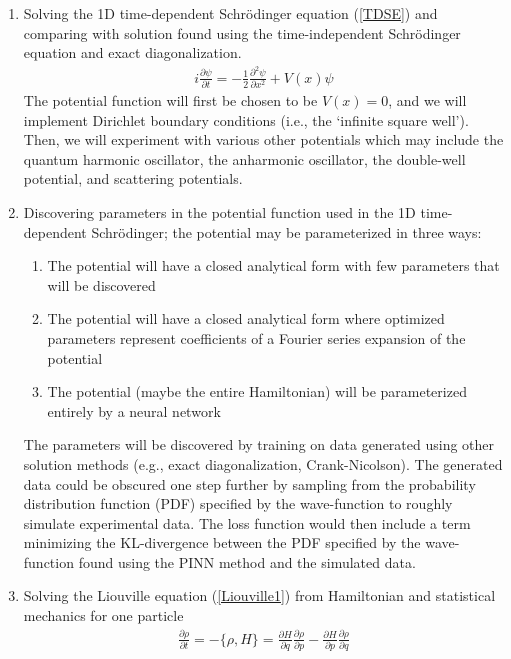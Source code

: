 \documentclass[10pt]{article}
\newcommand{\1}{\mathbf 1}
\begin{document}
\begin{enumerate}
	\item Solving the 1D time-dependent Schr\"odinger equation (\ref{TDSE}) and comparing with solution found using the time-independent Schr\"odinger equation and exact diagonalization.
	\begin{gather}
		i \frac{\partial \psi}{\partial t} = -\frac{1}{2} \frac{\partial^2\psi}{\partial x^2} + V(x) \psi
		\label{TDSE}
	\end{gather}
	The potential function will first be chosen to be $V(x) = 0$, and we will implement Dirichlet boundary conditions (i.e., the `infinite square well').
	Then, we will experiment with various other potentials which may include the quantum harmonic oscillator, the anharmonic oscillator, the double-well potential, and scattering potentials.
	\item Discovering parameters in the potential function used in the 1D time-dependent Schr\"odinger; the potential may be parameterized in three ways:
	\begin{enumerate}
		\item The potential will have a closed analytical form with few parameters that will be discovered
		\item The potential will have a closed analytical form where optimized parameters represent coefficients of a Fourier series expansion of the potential
		\item The potential (maybe the entire Hamiltonian) will be parameterized entirely by a neural network
	\end{enumerate}
	The parameters will be discovered by training on data generated using other solution methods (e.g., exact diagonalization, Crank-Nicolson).
	The generated data could be obscured one step further by sampling from the probability distribution function (PDF) specified by the wave-function to roughly simulate experimental data.
	The loss function would then include a term minimizing the KL-divergence between the PDF specified by the wave-function found using the PINN method and the simulated data.
	\item Solving the Liouville equation (\ref{Liouville1}) from Hamiltonian and statistical mechanics for one particle
	\begin{align}
		\label{Liouville1}
		\frac{\partial \rho}{\partial t}
		=
		-
		\{ \rho, H\}
		=
		\frac{\partial H}{\partial q}
		\frac{\partial \rho}{\partial p}
		-
		\frac{\partial H}{\partial p}
		\frac{\partial \rho}{\partial q}
	\end{align}

\end{enumerate}
\end{document}
